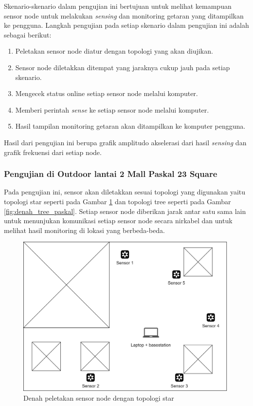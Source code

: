 Skenario-skenario dalam pengujian ini bertujuan untuk melihat kemampuan sensor node untuk melakukan \textit{sensing} dan monitoring getaran yang ditampilkan ke pengguna. Langkah pengujian pada setiap skenario dalam pengujian ini adalah sebagai berikut:
\begin{enumerate}
    \item Peletakan sensor node diatur dengan topologi yang akan diujikan.
    \item Sensor node diletakkan ditempat yang jaraknya cukup jauh pada setiap skenario.
    \item Mengecek status online setiap sensor node melalui komputer.
    \item Memberi perintah \textit{sense} ke setiap sensor node melalui komputer.
    \item Hasil tampilan monitoring getaran akan ditampilkan ke komputer pengguna.
\end{enumerate}
Hasil dari pengujian ini berupa grafik amplitudo akselerasi dari hasil \textit{sensing} dan grafik frekuensi dari setiap node.

\subsubsection{Pengujian di Outdoor lantai 2 Mall Paskal 23 Square}
Pada pengujian ini, sensor akan diletakkan sesuai topologi yang digunakan yaitu topologi star seperti pada Gambar \ref{fig:denah_star_paskal} dan topologi tree seperti pada Gambar \ref{fig:denah_tree_paskal}. Setiap sensor node diberikan jarak antar satu sama lain untuk menunjukan komunikasi setiap sensor node secara nirkabel dan untuk melihat hasil monitoring di lokasi yang berbeda-beda. 

\begin{figure}[H] 
	\centering  
	\includegraphics[scale=0.3]{Gambar/Hasil Sensing/Pengujian-Star Paskal 23.jpg}  
	\caption[Denah peletakan sensor node dengan topologi star]{Denah peletakan sensor node dengan topologi star}
	\label{fig:denah_star_paskal} 
\end{figure}

